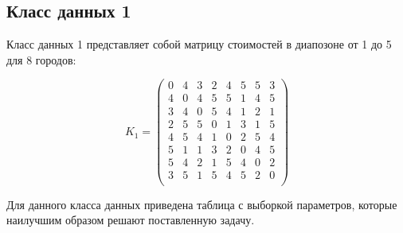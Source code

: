 \subsection{Класс данных 1}

Класс данных 1 представляет собой матрицу стоимостей в диапозоне от 1 до 5 для 8 городов:

\begin{equation}
    \label{eq:kd1}
	K_{1} = \begin{pmatrix}
		0 & 4 & 3 & 2 & 4 & 5 & 5 & 3 \\
		4 & 0 & 4 & 5 & 5 & 1 & 4 & 5 \\
		3 & 4 & 0 & 5 & 4 & 1 & 2 & 1 \\
		2 & 5 & 5 & 0 & 1 & 3 & 1 & 5 \\
		4 & 5 & 4 & 1 & 0 & 2 & 5 & 4 \\
		5 & 1 & 1 & 3 & 2 & 0 & 4 & 5 \\
		5 & 4 & 2 & 1 & 5 & 4 & 0 & 2 \\
		3 & 5 & 1 & 5 & 4 & 5 & 2 & 0 \\
	\end{pmatrix}
\end{equation}

Для данного класса данных приведена таблица с выборкой параметров, которые наилучшим образом решают поставленную задачу.

